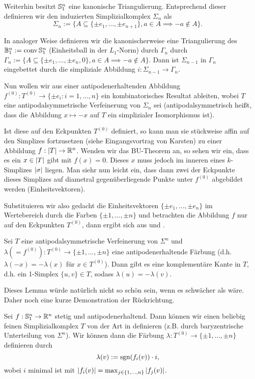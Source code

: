 \documentclass[10pt,a4paper]{article}
\begin{document}
Weiterhin besitzt $\mathbb{S}^n_1$ eine kanonische Triangulierung. Entsprechend dieser definieren wir den induzierten Simplizialkomplex $\Sigma_n$ als
\[\Sigma_n:=\{A\subseteq\{\pm e_1,\ldots,\pm e_{n+1}\}, a\in A\implies -a\notin A\}.\]

In analoger Weise definieren wir die kanonischerweise eine Triangulierung des $\mathbb{B}^n_1:=\mathop\mathrm{conv}\mathbb{S}^n_1$ (Einheitsball in der $L_1$-Norm) durch $\Gamma_n$ durch $\Gamma_n:=\{A\subseteq\{\pm e_1,\ldots,\pm e_n,0\}, a\in A\implies -a\notin A\}$.
Dann ist $\Sigma_{n-1}$ in $\Gamma_n$ eingebettet durch die simpliziale Abbildung $i:\Sigma_{n-1}\to\Gamma_n$.

Nun wollen wir aus einer antipodenerhaltenden Abbildung $f^{(0)}:T^{(0)}\to\{\pm e_i:i=1,\ldots,n\}$ ein kombinatorisches Resultat ableiten, wobei $T$ eine antipodalsymmetrische Verfeinerung von $\Sigma_n$ sei (antipodalsymmetrisch heißt, dass die Abbildung $x\mapsto -x$ auf $T$ ein simplizialer Isomorphismus ist).

Ist diese auf den Eckpunkten $T^{(0)}$ definiert, so kann man sie stückweise affin auf den Simplizes fortzusetzen (siehe Eingangsvortrag von Karsten) zu einer Abbildung $f:\left|T\right|\rightarrow\mathbb{R}^n$. Wenden wir das BU-Theorem an, so sehen wir ein, dass es ein $x\in \left|T\right|$ gibt mit $f(x)=0$. Dieses $x$ muss jedoch im inneren eines $k$-Simplizes $\left|\sigma\right|$ liegen. Man siehr nun leicht ein, dass dann zwei der Eckpunkte dieses Simplizes auf diametral gegenüberliegende Punkte unter $f^{(0)}$ abgebildet werden (Einheitsvektoren). 

Substituieren wir also gedacht die Einheitsvektoren $\{\pm e_1,\ldots, \pm e_n\}$ im Wertebereich durch die Farben $\{\pm1,\ldots,\pm n\}$ und betrachten die Abbildung $f$ nur auf den Eckpunkten $T^{(0)}$, dann ergibt sich aus  und .

\begin{lemma}[Tucker]\label{lem:tuck}
Sei $T$ eine antipodalsymmetrische Verfeinerung von $\Sigma^n$ und $\lambda(=f^{(0)}):T^{(0)}\to\{\pm1,\ldots,\pm n\}$ eine antipodenerhaltende Färbung (d.h. $\lambda(-x)=-\lambda(x)$ für $x\in T^{(0)}$). Dann gibt es eine komplementäre Kante in $T$, d.h. ein 1-Simplex $\{u,v\}\in T$, sodass $\lambda(u)=-\lambda(v)$. 
\end{lemma}

Dieses Lemma würde natürlich nicht so schön sein, wenn es schwächer als  wäre.
Daher noch eine kurze Demonstration der Rückrichtung.

Sei $f:\mathbb{S}^n_1\rightarrow\mathbb{R}^n$ stetig und antipodenerhaltend. Dann können wir einen beliebig feinen Simplizialkomplex $T$ von der Art in  definieren (z.B. durch baryzentrische Unterteilung von $\Sigma^n$). Wir können dann die Färbung $\lambda:T^{(0)}\to \{\pm1,\ldots,\pm n\}$ definieren durch
\begin{equation}
\lambda(v):=\mathop\mathrm{sgn}(f_i(v))\cdot i, 
\end{equation}
wobei $i$ minimal ist mit $\left|f_i(v)\right|=\max_{j\in\{1,\ldots,n\}}{|f_j(v)|}$.
\end{document}
